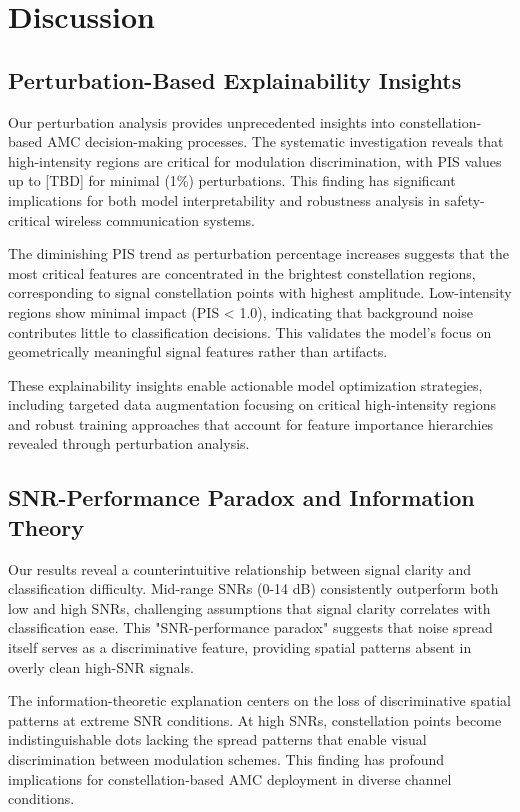 \documentclass{ELSP}
\begin{document}
{{\section{Discussion}

\subsection{Perturbation-Based Explainability Insights}

Our perturbation analysis provides unprecedented insights into constellation-based AMC decision-making processes. The systematic investigation reveals that high-intensity regions are critical for modulation discrimination, with PIS values up to [TBD] for minimal (1\%) perturbations. This finding has significant implications for both model interpretability and robustness analysis in safety-critical wireless communication systems.

The diminishing PIS trend as perturbation percentage increases suggests that the most critical features are concentrated in the brightest constellation regions, corresponding to signal constellation points with highest amplitude. Low-intensity regions show minimal impact (PIS < 1.0), indicating that background noise contributes little to classification decisions. This validates the model's focus on geometrically meaningful signal features rather than artifacts.

These explainability insights enable actionable model optimization strategies, including targeted data augmentation focusing on critical high-intensity regions and robust training approaches that account for feature importance hierarchies revealed through perturbation analysis.

\subsection{SNR-Performance Paradox and Information Theory}

Our results reveal a counterintuitive relationship between signal clarity and classification difficulty. Mid-range SNRs (0-14 dB) consistently outperform both low and high SNRs, challenging assumptions that signal clarity correlates with classification ease. This "SNR-performance paradox" suggests that noise spread itself serves as a discriminative feature, providing spatial patterns absent in overly clean high-SNR signals.

The information-theoretic explanation centers on the loss of discriminative spatial patterns at extreme SNR conditions. At high SNRs, constellation points become indistinguishable dots lacking the spread patterns that enable visual discrimination between modulation schemes. This finding has profound implications for constellation-based AMC deployment in diverse channel conditions.

}}
\end{document}
